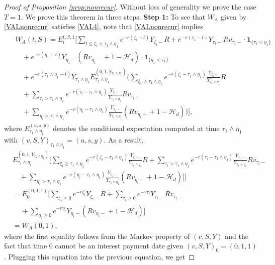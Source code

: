 \documentclass[11pt]{article}%
\numberwithin{equation}{section}
\theoremstyle{plain}
\begin{document}
\begin{appendices}
\begin{proof}[Proof of Proposition \ref{prop:nonrecur}]
	Without loss of generality we prove the case $T=1$. We prove this theorem in three steps.
	{\flushleft\bf Step 1:}
	To see that $W_A$ given by \eqref{VALnonrecur} satisfies \eqref{VAL4}, note that \eqref{VALnonrecur} implies
	\begin{align*}
	\begin{split}
	&W_A(t,S)=E_t^{t,S,1}\Bigg[\sum_{t\le\zeta_i<\tau_1\land\eta_1}e^{-r(\zeta_i-t)}Y_{\zeta_i-}R+e^{-r(\tau_1-t)}Y_{\tau_1-}Rv_{\tau_1-}\cdot\mathbf{1}_{\{\tau_1<\eta_1\}}\\
	&\quad+e^{-r(\eta_1-t)}Y_{\eta_1-}(Rv_{\eta_1-}+1-\mathcal{H}_d)\cdot\mathbf{1}_{\{\eta_1<\tau_1\}}\\
	&\quad+e^{-r(\tau_1\land\eta_1-t)}Y_{\tau_1\land\eta_1}E_{\tau_1\land\eta_1}^{(0,1,Y_{\tau_1\land\eta_1})}\Bigg(\sum_{\xi_i\ge\tau_1\land\eta_1}e^{-r(\zeta_i-\tau_1\land\eta_1)}\frac{Y_{\zeta_i-}}{Y_{\tau_1\land\eta_1}}R\\
	&\quad+\sum_{\tau_i>\tau_1\land\eta_1}e^{-r(\tau_i-\tau_1\land\eta_1)}\frac{Y_{\tau_i-}}{Y_{\tau_1\land\eta_1}}Rv_{\tau_i-}\\
	&\quad+\sum_{\eta_i>\tau_1\land\eta_1}e^{-r(\eta_i-\tau_1\land\eta_1)}\frac{Y_{\eta_i-}}{Y_{\tau_1\land\eta_1}}(Rv_{\eta_i-}+1-\mathcal{H}_d)\Bigg)\Bigg],
	\end{split}
	\end{align*}
	where $E_{\tau_1\land\eta_1}^{(u,s,y)}$ denotes the conditional expectation computed at time $\tau_1\land\eta_1$ with $(v,S,Y)_{\tau_1\land\eta_1}=(u,s,y)$. As a result,
	\begin{align*}
	 &E_{\tau_1\land\eta_1}^{(0,1,Y_{\tau_1\land\eta_1})}\Bigg[\sum_{\xi_i\ge\tau_1\land\eta_1}e^{-r(\zeta_i-\tau_1\land\eta_1)}\frac{Y_{\zeta_i-}}{Y_{\tau_1\land\eta_1}}R+\sum_{\tau_i>\tau_1\land\eta_1}e^{-r(\tau_i-\tau_1\land\eta_1)}\frac{Y_{\tau_i-}}{Y_{\tau_1\land\eta_1}}Rv_{\tau_i-}\\
	&\quad+\sum_{\eta_i>\tau_1\land\eta_1}e^{-r(\eta_i-\tau_1\land\eta_1)}\frac{Y_{\eta_i-}}{Y_{\tau_1\land\eta_1}}(Rv_{\eta_i-}+1-\mathcal{H}_d)\Bigg]\Bigg]\\
	&=E_{0}^{(0,1,1)}\Bigg[\sum_{\xi_i\ge0}e^{-r\zeta_i}Y_{\zeta_i-}R+\sum_{\tau_i\ge0}e^{-r\tau_i}Y_{\tau_i-}Rv_{\tau_i-} \\
	&~ \quad +\sum_{\eta_i\ge0}e^{-r\eta_i}Y_{\eta_i-}(Rv_{\eta_i-}+1-\mathcal{H}_d)\Bigg]\\
	&=W_A(0,1),
	\end{align*}
	where the first equality follows from the Markov property of $(v,S,Y)$ and the fact that time 0 cannot be an interest payment date given $(v,S,Y)_0=(0,1,1)$. Plugging this equation into the previous equation, we get

\end{proof}
\end{appendices}
\end{document}
